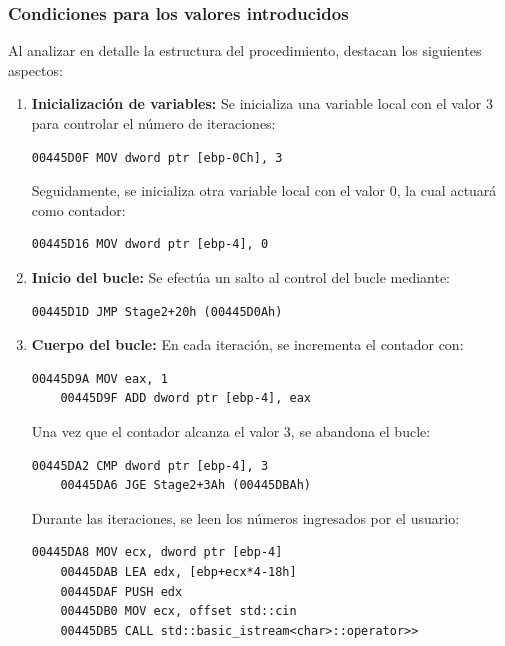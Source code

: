 \documentclass[11pt,a4paper]{article}
\begin{document}
\subsubsection{Condiciones para los valores introducidos}
\noindent Al analizar en detalle la estructura del procedimiento, destacan los siguientes aspectos:
\begin{enumerate}
  \item \textbf{Inicialización de variables:} Se inicializa una variable local con el valor 3 para controlar el número de iteraciones: \vspace{1ex}
  \begin{lstlisting}[style=assemblyStyle]
    00445D0F MOV dword ptr [ebp-0Ch], 3
  \end{lstlisting}
  Seguidamente, se inicializa otra variable local con el valor 0, la cual actuará como contador: \vspace{1ex}
  \begin{lstlisting}[style=assemblyStyle]
    00445D16 MOV dword ptr [ebp-4], 0
  \end{lstlisting}
  \vspace{1ex}

  \item \textbf{Inicio del bucle:} Se efectúa un salto al control del bucle mediante: \vspace{1ex}
  \begin{lstlisting}[style=assemblyStyle]
    00445D1D JMP Stage2+20h (00445D0Ah)
  \end{lstlisting}
  \vspace{1ex}

  \item \textbf{Cuerpo del bucle:} En cada iteración, se incrementa el contador con: \vspace{1ex}
  \begin{lstlisting}[style=assemblyStyle]
    00445D9A MOV eax, 1
    00445D9F ADD dword ptr [ebp-4], eax
  \end{lstlisting}
  \vspace{1ex}

  Una vez que el contador alcanza el valor 3, se abandona el bucle: \vspace{1ex}
  \begin{lstlisting}[style=assemblyStyle]
    00445DA2 CMP dword ptr [ebp-4], 3
    00445DA6 JGE Stage2+3Ah (00445DBAh)
  \end{lstlisting}
  \vspace{1ex}

  Durante las iteraciones, se leen los números ingresados por el usuario: \vspace{1ex}
  \begin{lstlisting}[style=assemblyStyle]
    00445DA8 MOV ecx, dword ptr [ebp-4]
    00445DAB LEA edx, [ebp+ecx*4-18h]
    00445DAF PUSH edx
    00445DB0 MOV ecx, offset std::cin
    00445DB5 CALL std::basic_istream<char>::operator>>
  \end{lstlisting}
  \vspace{1ex}


\end{enumerate}
\end{document}
